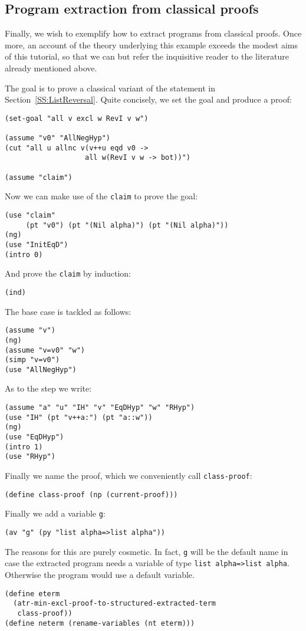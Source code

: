 \documentclass[12pt]{amsart}
\begin{document}
\subsection{Program extraction from classical proofs}
\label{SS:ExtrClass}
Finally, we wish to exemplify how to extract programs from classical
proofs.  Once more, an account of the theory underlying this example
exceeds the modest aims of this tutorial, so that we can but refer the
inquisitive reader to the literature already mentioned above.

The goal is to prove a classical variant of the statement in
Section~\ref{SS:ListReversal}.  Quite concisely, we set the goal and
produce a proof:
\begin{verbatim}
(set-goal "all v excl w RevI v w")

(assume "v0" "AllNegHyp")
(cut "all u allnc v(v++u eqd v0 ->
                   all w(RevI v w -> bot))")

(assume "claim")
\end{verbatim}

Now we can make use of the \texttt{claim} to prove the goal:
\begin{verbatim}
(use "claim"
     (pt "v0") (pt "(Nil alpha)") (pt "(Nil alpha)"))
(ng)
(use "InitEqD")
(intro 0)
\end{verbatim}

And prove the \texttt{claim} by induction:
\begin{verbatim}
(ind)
\end{verbatim}

The base case is tackled as follows:
\begin{verbatim}
(assume "v")
(ng)
(assume "v=v0" "w")
(simp "v=v0")
(use "AllNegHyp")
\end{verbatim}

As to the step we write:
\begin{verbatim}
(assume "a" "u" "IH" "v" "EqDHyp" "w" "RHyp")
(use "IH" (pt "v++a:") (pt "a::w"))
(ng)
(use "EqDHyp")
(intro 1)
(use "RHyp")
\end{verbatim}

Finally we name the proof, which we conveniently call \texttt{class-proof}:
\begin{verbatim}
(define class-proof (np (current-proof)))
\end{verbatim}
Finally we add a variable \texttt{g}:
\begin{verbatim}
(av "g" (py "list alpha=>list alpha"))
\end{verbatim}
The reasons for this are purely cosmetic. In fact, \texttt{g} will be
the default name in case the extracted program needs a variable of
type \texttt{list alpha=>list alpha}.  Otherwise the program would use
a default variable.
\begin{verbatim}
(define eterm
  (atr-min-excl-proof-to-structured-extracted-term
   class-proof))
(define neterm (rename-variables (nt eterm)))
\end{verbatim}
\end{document}
